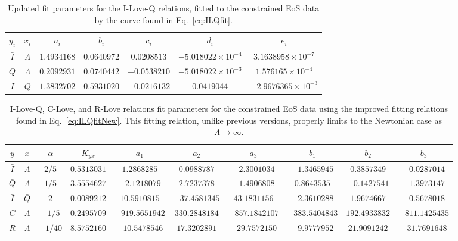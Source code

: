 \documentclass[prd,twocolumn,nofootinbib,superscriptaddress,amsmath,amssymb]{revtex4-1}
\begin{document}
\begin{table*}
\centering
\caption{
Updated fit parameters for the I-Love-Q relations, fitted to the constrained EoS data by the curve found in Eq.~\ref{eq:ILQfit}.
}\label{tab:ILQfit}
\begin{tabular}{ c  c | c c c c c } 
 \hline
 \hline
 $y_i$ & $x_i$ & $a_i$ & $b_i$ & $c_i$ & $d_i$ & $e_i$ \\
 \hline
 $\bar{I}$ & $\Lambda$ & $1.4934168$ & $0.0640972$ & $0.0208513$ & $-5.018022 \times 10^{-4}$ & $3.1638958 \times 10^{-7}$ \\
 $\bar{Q}$ & $\Lambda$ & $0.2092931$ & $0.0740442$ & $-0.0538210$ & $-5.018022 \times 10^{-3}$ & $1.576165 \times 10^{-4}$ \\ 
  $\bar{I}$ & $\bar{Q}$ & $1.3832702$ & $0.5931020$ & $-0.0216132$ & $0.0419044$ & $-2.9676365 \times 10^{-3}$ \\
 \hline
 \hline
\end{tabular}
\end{table*}

\begin{table*}
\centering
\caption{
I-Love-Q, C-Love, and R-Love relations fit parameters for the constrained EoS data using the improved fitting relations found in Eq.~\ref{eq:ILQfitNew}.
This fitting relation, unlike previous versions, properly limits to the Newtonian case as $\Lambda \rightarrow \infty$.
}\label{tab:ILQfitNew}
\begin{tabular}{ c  c  | c c c c c c c c} 
 \hline
 \hline
 $y$ & $x$ & $\alpha$ & $K_{yx}$ & $a_1$ & $a_2$ & $a_3$ & $b_1$ & $b_2$ & $b_3$ \\
 \hline
 $\bar{I}$ & $\Lambda$ & $2/5$ & $0.5313031$ & $1.2868285$ & $0.0988787$ & $-2.3001034$ & $-1.3465945$ & $0.3857349$ & $-0.0287014$\\
 $\bar{Q}$ & $\Lambda$ & $1/5$ & $3.5554627$ & $-2.1218079$ & $2.7237378$ & $-1.4906808$ & $0.8643535$ & $-0.1427541$ & $-1.3973147$\\
 $\bar{I}$ & $\bar{Q}$ & $2$ & $0.0089212$ & $10.5910815$ & $-37.4581345$ & $43.1831156$ & $-2.3610288$ & $1.9674667$ & $-0.5678018$\\
 $C$ & $\Lambda$ & $-1/5$ & $0.2495709$ & $-919.5651942$ & $330.2848184$ & $-857.1842107$ & $-383.5404843$ & $192.4933832$ & $-811.1425435$\\
 $R$ & $\Lambda$ & $-1/40$ & $8.5752160$ & $-10.5478546$ & $17.3202891$ & $-29.7572150$ & $-9.9777952$ & $21.9091242$ & $-31.7691648$\\
\hline
\hline
\end{tabular}
\end{table*}
\end{document}
